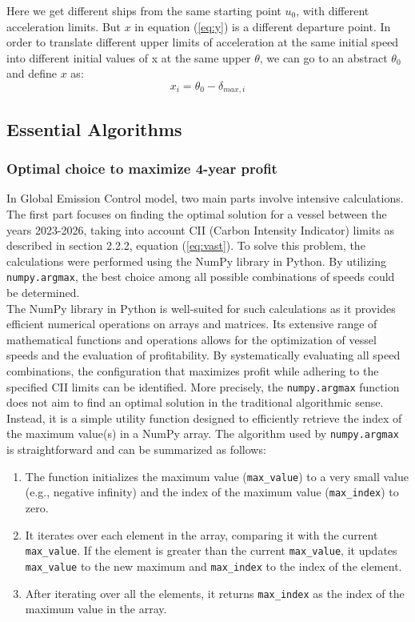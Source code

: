 \documentclass[a4paper,12pt]{article}
\begin{document}
Here we get different ships from the same starting point $u_0$, with different acceleration limits.
But $x$ in equation (\ref{eq:y}) is a different departure point. In order to translate different upper limits of acceleration at the same initial speed into different initial values of x at the same upper $\theta$, we can go to an abstract $\theta_0$ and define $x$ as:
\begin{equation}
	x_i = \theta_0 - \delta_{max,i}
\end{equation}

\subsection{Essential Algorithms}
\subsubsection{Optimal choice to maximize 4-year profit}

In Global Emission Control model, two main parts involve intensive calculations.
The first part focuses on finding the optimal solution for a vessel between the years 2023-2026, taking into account CII (Carbon Intensity Indicator) limits as described in section 2.2.2, equation ({\ref{eq:vast}}).
To solve this problem, the calculations were performed using the NumPy library in Python.
By utilizing \texttt{numpy.argmax}, the best choice among all possible combinations of speeds could be determined.\\

The NumPy library in Python is well-suited for such calculations as it provides efficient numerical operations on arrays and matrices.
Its extensive range of mathematical functions and operations allows for the optimization of vessel speeds and the evaluation of profitability.
By systematically evaluating all speed combinations, the configuration that maximizes profit while adhering to the specified CII limits can be identified.
More precisely, the \texttt{numpy.argmax} function does not aim to find an optimal solution in the traditional algorithmic sense. Instead, it is a simple utility function designed to efficiently retrieve the index of the maximum value(s) in a NumPy array.
The algorithm used by \texttt{numpy.argmax} is straightforward and can be summarized as follows:

\begin{enumerate}
	\item The function initializes the maximum value (\texttt{max\_value}) to a very small value (e.g., negative infinity) and the index of the maximum value (\texttt{max\_index}) to zero.
	\item It iterates over each element in the array, comparing it with the current \texttt{max\_value}. If the element is greater than the current \texttt{max\_value}, it updates \texttt{max\_value} to the new maximum and \texttt{max\_index} to the index of the element.
	\item After iterating over all the elements, it returns \texttt{max\_index} as the index of the maximum value in the array.
\end{enumerate}
\end{document}
